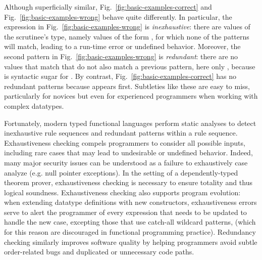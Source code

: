 Although superficially similar, Fig.~\ref{fig:basic-examples-correct} and Fig.~\ref{fig:basic-examples-wrong}
behave quite differently. In particular, the  expression in Fig.~\ref{fig:basic-examples-wrong} is \emph{inexhaustive}: there are values of the scrutinee's type, namely values of the form , for which none of the patterns will match, leading to a run-time error or undefined behavior. 
Moreover, the second pattern in Fig.~\ref{fig:basic-examples-wrong} is \emph{redundant}: there are no values that match  that do not also match a
previous pattern, here only , because \li{[x, y]} is syntactic sugar for .
By contrast, Fig.~\ref{fig:basic-examples-correct} has no redundant patterns because  appears first.
Subtleties like these are easy to miss, particularly for novices but even for experienced programmers when working with complex datatypes. 

Fortunately,
modern typed functional languages perform static analyses to detect inexhaustive rule sequences and redundant patterns within a rule sequence.
Exhaustiveness checking compels programmers to consider all possible inputs, including rare cases that may lead to undesirable or undefined behavior. Indeed, many major security issues can be understood as a failure to exhaustively case analyze (e.g. null pointer exceptions).
In the setting of a dependently-typed theorem prover, exhaustiveness checking is necessary to ensure totality and thus logical soundness.
Exhaustiveness checking also supports program evolution: when extending datatype definitions with new constructors, exhaustiveness errors 
serve to alert the programmer of every  expression that needs to be updated to handle the new case, excepting those that use catch-all wildcard patterns, \li{_} (which for this reason are discouraged in functional programming practice).
Redundancy checking similarly improves software quality by helping programmers avoid subtle order-related bugs and duplicated or unnecessary code paths.



